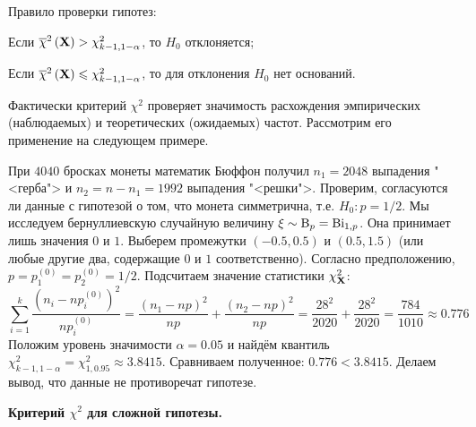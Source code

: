 Правило проверки гипотез:
\begin{compactlist}
    \item Если $\overline{\chi}^{2} \left(\mathbf{X}\right)>\chi^{2}_{k-1, 1 - \alpha}$, то $H_0$ отклоняется;
    \item Если $\overline{\chi}^{2} \left(\mathbf{X}\right) \leqslant \chi^{2}_{k-1, 1 - \alpha}$, то для отклонения $H_0$ нет оснований.
\end{compactlist}
\medskip


Фактически критерий $\chi^{2}$ проверяет значимость расхождения эмпирических (наблюдаемых) и теоретических (ожидаемых) частот. 
Рассмотрим его применение на следующем примере.

\begin{exmp}
    При $4040$ бросках монеты математик Бюффон получил $n_1 = 2048$ выпадения "<герба"> и $n_2 = n - n_1 = 1992$ выпадения "<решки">.
    Проверим, согласуются ли данные с гипотезой о том, что монета симметрична, т.е. $H_0 \colon p = 1/2$.
    Мы исследуем бернуллиевскую случайную величину $\xi \sim \operatorname{\mathrm{B}}_{p} = \operatorname{\mathrm{Bi}}_{1, p}$.
    Она принимает лишь значения $0$ и $1$.
    Выберем промежутки $(-0.5, 0.5)$ и $(0.5, 1.5)$ (или любые другие два, содержащие $0$ и $1$ соответственно).
    Согласно предположению, $p = p_1^{(0)} = p_2^{(0)} = 1/2$.
    Подсчитаем значение статистики $\chi^{2}_{\mathbf{X}}$:
    \begin{equation*}
        \sum\limits_{i = 1}^{k} \frac{(n_i - np_i^{(0)})^2}{np_i^{(0)}} = 
        \frac{(n_1 - np)^2}{np} + \frac{(n_2 - np)^2}{np} = 
        \frac{28^2}{2020} + \frac{28^2}{2020} = \frac{784}{1010} \approx 0.776
    \end{equation*}
    Положим уровень значимости $\alpha = 0.05$ и найдём квантиль $\chi^2_{k-1, 1 - \alpha} = \chi^2_{1, 0.95} \approx 3.8415$.
    Сравниваем полученное: $0.776 < 3.8415$.
    Делаем вывод, что данные не противоречат гипотезе.
\end{exmp}

\noindent \textbf{Критерий $\chi^2$ для сложной гипотезы.}

